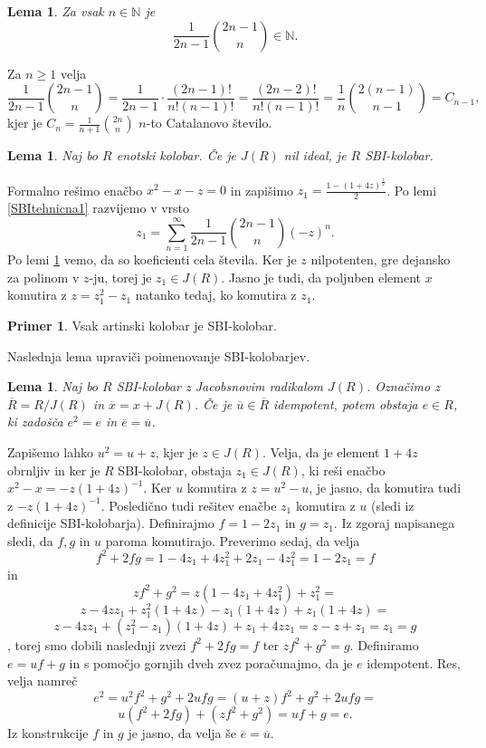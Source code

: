 \documentclass[a4paper, 12pt]{amsart}
\theoremstyle{definition} %
\newtheorem{primer}[definicija]{Primer}
\theoremstyle{plain} %
\newtheorem{lema}[definicija]{Lema}
\newcommand{\N}{\mathbb N}
\begin{document}
\begin{lema}
\label{SBItehnicna2}
Za vsak $n\in \N$ je 
$$
\frac{1}{2n-1} {2n-1 \choose n} \in \N.
$$
\end{lema}

\proof
Za $n\ge 1$ velja 
$$
\frac{1}{2n-1} {2n-1 \choose n} = \frac{1}{2n-1}\cdot\frac{(2n-1)!}{n! (n-1)!} = \frac{(2n-2)!}{n!(n-1)!} = \frac{1}{n} {2(n-1) \choose n-1} = C_{n-1},
$$
kjer je $C_n = \frac{1}{n+1}{2n \choose n}$ $n$-to Catalanovo število. 
\endproof

\begin{lema}
\label{nilJeSBI}
Naj bo $R$ enotski kolobar. Če je $J(R)$ nil ideal, je $R$ SBI-kolobar.
\end{lema}

\proof
Formalno rešimo enačbo $x^2 - x - z = 0$ in zapišimo $z_1 = \frac{1-(1+4z)^{\frac{1}{2}}}{2}$. Po lemi \ref{SBItehnicna1} razvijemo v vrsto
$$
z_1 = \sum_{n=1}^{\infty} \frac{1}{2n-1} \binom{2n-1}{n}(-z)^n.
$$
Po lemi \ref{SBItehnicna2} vemo, da so koeficienti cela števila. Ker je $z$ nilpotenten, gre dejansko za polinom v $z$-ju, torej je $z_1 \in J(R)$. Jasno je tudi, da poljuben element $x$ komutira z $z=z_1^2 - z_1$ natanko tedaj, ko komutira z $z_1$.
\endproof

\begin{primer}
Vsak artinski kolobar je SBI-kolobar.
\end{primer}

Naslednja lema upraviči poimenovanje SBI-kolobarjev.

\begin{lema}
\label{SBIEnIdem}
Naj bo $R$ SBI-kolobar z Jacobsnovim radikalom $J(R)$. Označimo z $\overline{R} = R/J(R)$ in $\overline{x} = x + J(R)$. Če je $\overline{u} \in \overline{R}$ idempotent, potem obstaja $e\in R$, ki zadošča $e^2 = e$ in $\overline{e} = \overline{u}$.
\end{lema}

\proof
Zapišemo lahko $u^2 = u+z$, kjer je $z\in J(R)$. Velja, da je element $1+4z$ obrnljiv in ker je $R$ SBI-kolobar, obstaja $z_1\in  J(R)$, ki reši enačbo $x^2 - x = -z(1+4z)^{-1}$. Ker $u$ komutira z $z=u^2 - u$, je jasno, da komutira tudi z $-z(1+4z)^{-1}$. Posledično tudi rešitev enačbe $z_1$ komutira z $u$ (sledi iz definicije SBI-kolobarja). Definirajmo $f=1-2z_1$ in $g=z_1$. Iz zgoraj napisanega sledi, da $f,g$ in $u$ paroma komutirajo. Preverimo sedaj, da velja
$$
f^2 +2fg = 1-4z_1 + 4 z_1^2 + 2z_1 - 4z_1^2 = 1 - 2z_1 = f
$$  
in
$$
zf^2 + g^2 = z(1-4z_1 + 4z_1^2) + z_1^2 =
$$
$$
z- 4zz_1 + z_1^2(1+4z) - z_1(1+4z) + z_1(1+4z) =
$$
$$
z - 4zz_1 + (z_1^2 - z_1)(1+4z) + z_1 +4zz_1 = z-z+z_1=z_1=g
$$,
torej smo dobili naslednji zvezi $f^2 + 2fg = f$ ter $zf^2 + g^2 = g$. Definiramo $e = uf +g$ in s pomočjo gornjih dveh zvez poračunajmo, da je $e$ idempotent. Res, velja namreč
$$
e^2 = u^2 f^2 + g^2 + 2ufg = (u+z)f^2 + g^2 + 2ufg = 
$$
$$
u(f^2 +2fg) + (zf^2 +g^2) = uf +g = e.
$$
Iz konstrukcije $f$ in $g$ je jasno, da velja še $\overline{e} = \overline{u}$.
\endproof
\end{document}
